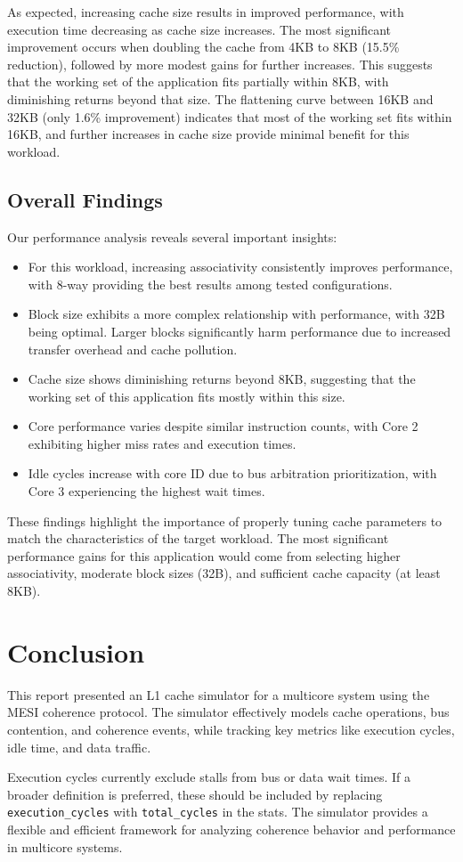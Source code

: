 \documentclass[a4paper,12pt]{article}
\begin{document}
As expected, increasing cache size results in improved performance, with execution time decreasing as cache size increases. The most significant improvement occurs when doubling the cache from 4KB to 8KB (15.5\% reduction), followed by more modest gains for further increases. This suggests that the working set of the application fits partially within 8KB, with diminishing returns beyond that size. The flattening curve between 16KB and 32KB (only 1.6\% improvement) indicates that most of the working set fits within 16KB, and further increases in cache size provide minimal benefit for this workload.

\subsection{Overall Findings}

Our performance analysis reveals several important insights:
\begin{itemize}
    \item For this workload, increasing associativity consistently improves performance, with 8-way providing the best results among tested configurations.
    \item Block size exhibits a more complex relationship with performance, with 32B being optimal. Larger blocks significantly harm performance due to increased transfer overhead and cache pollution.
    \item Cache size shows diminishing returns beyond 8KB, suggesting that the working set of this application fits mostly within this size.
    \item Core performance varies despite similar instruction counts, with Core 2 exhibiting higher miss rates and execution times.
    \item Idle cycles increase with core ID due to bus arbitration prioritization, with Core 3 experiencing the highest wait times.
\end{itemize}

These findings highlight the importance of properly tuning cache parameters to match the characteristics of the target workload. The most significant performance gains for this application would come from selecting higher associativity, moderate block sizes (32B), and sufficient cache capacity (at least 8KB).

\section{Conclusion}

This report presented an L1 cache simulator for a multicore system using the MESI coherence protocol. The simulator effectively models cache operations, bus contention, and coherence events, while tracking key metrics like execution cycles, idle time, and data traffic.

Execution cycles currently exclude stalls from bus or data wait times. If a broader definition is preferred, these should be included by replacing \texttt{execution\_cycles} with \texttt{total\_cycles} in the stats. The simulator provides a flexible and efficient framework for analyzing coherence behavior and performance in multicore systems.
\end{document}
